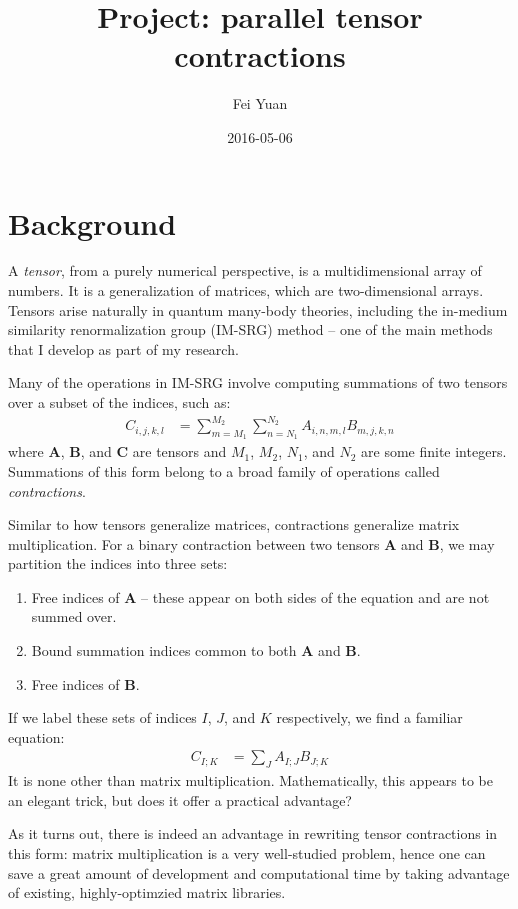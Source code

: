\documentclass[fleqn, 12pt]{article}
\begin{document}
\title{Project: parallel tensor contractions}
\date{2016-05-06}
\author{Fei Yuan}
\maketitle

\section{Background}

A \textit{tensor}, from a purely numerical perspective, is a multidimensional
array of numbers.  It is a generalization of matrices, which are
two-dimensional arrays.  Tensors arise naturally in quantum many-body
theories, including the in-medium similarity renormalization group (IM-SRG)
method -- one of the main methods that I develop as part of my research.

Many of the operations in IM-SRG involve computing summations of two tensors
over a subset of the indices, such as:
\begin{align}
  C_{i, j, k, l}
  &= \sum_{m = M_1}^{M_2} \sum_{n = N_1}^{N_2} A_{i, n, m, l} B_{m, j, k, n}
    \label{eq:a}
\end{align}
where $\bm A$, $\bm B$, and $\bm C$ are tensors and $M_1$, $M_2$, $N_1$, and
$N_2$ are some finite integers.  Summations of this form belong to a broad
family of operations called \textit{contractions}.

Similar to how tensors generalize matrices, contractions generalize matrix
multiplication.  For a binary contraction between two tensors $\bm A$ and
$\bm B$, we may partition the indices into three sets:
\begin{enumerate}
\item Free indices of $\bm A$ -- these appear on both sides of the equation and are not summed over.
\item Bound summation indices common to both $\bm A$ and $\bm B$.
\item Free indices of $\bm B$.
\end{enumerate}
If we label these sets of indices $I$, $J$, and $K$ respectively, we find a familiar equation:
\begin{align*}
  C_{I; K}
  &= \sum_J A_{I; J} B_{J; K}
\end{align*}
It is none other than matrix multiplication.  Mathematically, this appears to
be an elegant trick, but does it offer a practical advantage?

As it turns out, there is indeed an advantage in rewriting tensor contractions
in this form: matrix multiplication is a very well-studied problem, hence one
can save a great amount of development and computational time by taking
advantage of existing, highly-optimzied matrix libraries.
\end{document}
